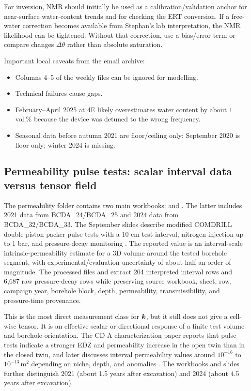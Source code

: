 For inversion, NMR should initially be used as a calibration/validation anchor for
near-surface water-content trends and for checking the ERT conversion.  If a free-water
correction becomes available from Stephan's lab interpretation, the NMR likelihood can
be tightened.  Without that correction, use a bias/error term or compare changes
\(\Delta\theta\) rather than absolute saturation.

Important local caveats from the email archive:

\begin{itemize}[leftmargin=1.5em]
  \item Columns 4--5 of the weekly files can be ignored for modelling.
  \item Technical failures cause gaps.
  \item February--April 2025 at 4E likely overestimates water content by about
  \(1\) vol.\% because the device was detuned to the wrong frequency.
  \item Seasonal data before autumn 2021 are floor/ceiling only; September 2020 is
  floor only; winter 2024 is missing.
\end{itemize}

\subsection{Permeability pulse tests: scalar interval data versus tensor field}

The permeability folder contains two main workbooks:
 and
.  The latter includes 2021 data from
BCDA\_24/BCDA\_25 and 2024 data from BCDA\_32/BCDA\_33.  The September slides describe
modified COMDRILL double-piston packer pulse tests with a 10 cm test interval,
nitrogen injection up to 1 bar, and pressure-decay monitoring
\cite[PDF p.~5]{CDAModellingSlides2025}.  The reported value is
an interval-scale intrinsic-permeability estimate for a 3D volume around the tested
borehole segment, with experimental/evaluation uncertainty of about half an order of
magnitude.  The processed files  and
 extract 204 interpreted interval rows and
6,687 raw pressure-decay rows while preserving source workbook, sheet, row, campaign
year, borehole block, depth, permeability, transmissibility, and pressure-time
provenance.

This is the most direct measurement class for \(\bm{k}\), but it still does not give a
cell-wise tensor.  It is an effective scalar or directional response of a finite test
volume and borehole orientation.  The CD-A characterization paper reports that pulse
tests indicate a stronger EDZ and permeability increase in the open twin than in the
closed twin, and later discusses interval permeability values around \(10^{-16}\) to
\(10^{-13}\,\mathrm{m^2}\) depending on niche, depth, and anomalies
\cite[PDF pp.~1, 11, Sect.~4.3 and Sect.~6]{Ziefle2024Characterization}.  The
workbooks and slides further distinguish 2021 (about 1.5 years after excavation) and
2024 (about 4.5 years after excavation).

